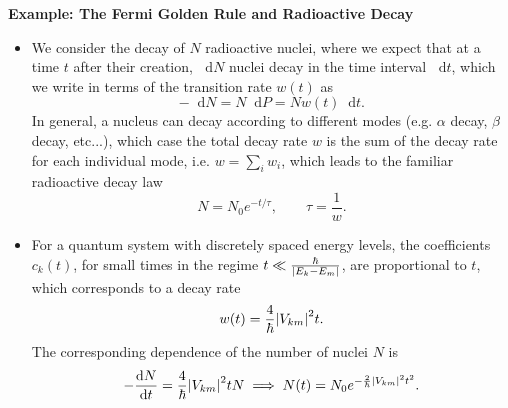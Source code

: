 \documentclass[11pt, a4paper]{article}
\newcommand{\diff}{\mathop{}\!\mathrm{d}} %
\begin{document}
\textbf{Example: The Fermi Golden Rule and Radioactive Decay}
\begin{itemize}
    \item We consider the decay of $ N $ radioactive nuclei, where we expect that at a time $ t $ after their creation, $ \diff N $ nuclei decay in the time interval $ \diff t $, which we write in terms of the transition rate $ w(t) $ as
    \begin{equation*}
        - \diff N = N \diff P = N w(t) \diff t.
    \end{equation*}
    In general, a nucleus can decay according to different modes (e.g. $ \alpha $ decay, $ \beta $ decay, etc...), which case the total decay rate $ w $ is the sum of the decay rate for each individual mode, i.e. $ w = \sum_{i} w_{i} $, which leads to the familiar radioactive decay law
    \begin{equation*}
        N = N_{0} e^{-t/\tau}, \qquad \tau = \frac{1}{w}.
    \end{equation*}
    
    \item For a quantum system with discretely spaced energy levels, the coefficients $ c_{k}(t) $, for small times in the regime $ t \ll \frac{\hbar}{\abs{E_{k} - E_{m}}} $, are proportional to $ t $, which corresponds to a decay rate 
    \begin{equation*}
        w(t) = \frac{4}{\hbar} \abs{V_{km}}^{2}t.
    \end{equation*}
    The corresponding dependence of the number of nuclei $ N $ is 
    \begin{equation*}
        - \dv{N}{t} = \frac{4}{\hbar}\abs{V_{km}}^{2}t N \implies N(t) = N_{0} e^{-\frac{2}{\hbar}\abs{V_{km}}^{2}t^{2}}.
    \end{equation*}
    
\end{itemize}
\end{document}
